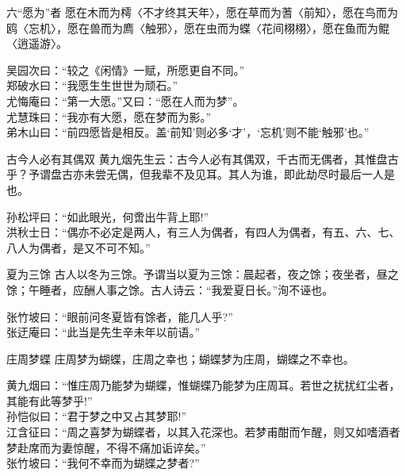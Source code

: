 \begin{yulu}{}

\begin{comments}

\end{comments}
\end{yulu}

\begin{yulu}{}

\begin{comments}

\end{comments}
\end{yulu}

\begin{yulu}{六“愿为”者}
愿在木而为樗〈不才终其天年〉，愿在草而为蓍〈前知〉，愿在鸟而为鸥〈忘机〉，愿在兽而为廌〈触邪〉，愿在虫而为蝶〈花间栩栩〉，愿在鱼而为鲲〈逍遥游〉。
\begin{comments}
吴园次曰：“较之《闲情》一赋，所愿更自不同。” \\
郑破水曰：“我愿生生世世为顽石。” \\
尤悔庵曰：“第一大愿。”又曰：“愿在人而为梦”。 \\
尤慧珠曰：“我亦有大愿，愿在梦而为影。” \\
弟木山曰：“前四愿皆是相反。盖‘前知’则必多‘才’，‘忘机’则不能‘触邪’也。”
\end{comments}
\end{yulu}

\begin{yulu}{古今人必有其偶双}
黄九烟先生云：古今人必有其偶双，千古而无偶者，其惟盘古乎？予谓盘古亦未尝无偶，但我辈不及见耳。其人为谁，即此劫尽时最后一人是也。
\begin{comments}
孙松坪曰：“如此眼光，何啻出牛背上耶!” \\
洪秋士日：“偶亦不必定是两人，有三人为偶者，有四人为偶者，有五、六、七、八人为偶者，是又不可不知。”
\end{comments}
\end{yulu}

\begin{yulu}{夏为三馀}
古人以冬为三馀。予谓当以夏为三馀：晨起者，夜之馀；夜坐者，昼之馀；午睡者，应酬人事之馀。古人诗云：“我爱夏日长。”洵不诬也。
\begin{comments}
张竹坡曰：“眼前问冬夏皆有馀者，能几人乎?” \\
张迂庵曰：“此当是先生辛未年以前语。”
\end{comments}
\end{yulu}

\begin{yulu}{庄周梦蝶}
庄周梦为蝴蝶，庄周之幸也；蝴蝶梦为庄周，蝴蝶之不幸也。
\begin{comments}
黄九烟曰：“惟庄周乃能梦为蝴蝶，惟蝴蝶乃能梦为庄周耳。若世之扰扰红尘者，其能有此等梦乎!” \\
孙恺似曰：“君于梦之中又占其梦耶!” \\
江含征曰：“周之喜梦为蝴蝶者，以其入花深也。若梦甫酣而乍醒，则又如嗜酒者梦赴席而为妻惊醒，不得不痛加诟谇矣。” \\
张竹坡曰：“我何不幸而为蝴蝶之梦者?”
\end{comments}
\end{yulu}

